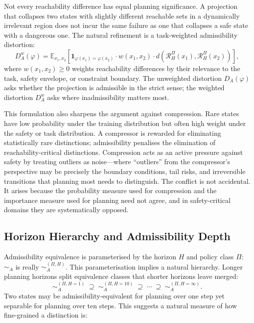 \documentclass[11pt, a4paper]{article}
\theoremstyle{plain}
\theoremstyle{definition}
\theoremstyle{remark}
\newcommand{\simA}{\sim_A}
\newcommand{\RHP}{\mathcal{R}_H^\Pi}
\newcommand{\DA}{D_A(\varphi)}
\begin{document}
Not every reachability difference has equal planning significance. A projection
that collapses two states with slightly different reachable sets in a dynamically
irrelevant region does not incur the same failure as one that collapses a safe
state with a dangerous one. The natural refinement is a task-weighted admissibility
distortion:
\begin{equation}
  D_A^w(\varphi)
  = \mathbb{E}_{x_1,x_2}\!\left[
      \mathbf{1}_{\varphi(x_1)=\varphi(x_2)}
      \cdot w(x_1,x_2)
      \cdot d\!\left(\RHP(x_1),\RHP(x_2)\right)
    \right],
\end{equation}
where $w(x_1,x_2) \geq 0$ weights reachability differences by their relevance
to the task, safety envelope, or constraint boundary. The unweighted distortion
$\DA$ asks whether the projection is admissible in the strict sense; the weighted
distortion $D_A^w$ asks where inadmissibility matters most.

This formulation also sharpens the argument against compression. Rare states have
low probability under the training distribution but often high weight under the
safety or task distribution. A compressor is rewarded for eliminating statistically
rare distinctions; admissibility penalises the elimination of reachability-critical
distinctions. Compression acts as an active pressure against safety by treating
outliers as noise---where ``outliers'' from the compressor's perspective may be
precisely the boundary conditions, tail risks, and irreversible transitions that
planning most needs to distinguish. The conflict is not accidental. It arises
because the probability measure used for compression and the importance measure
used for planning need not agree, and in safety-critical domains they are
systematically opposed.

\subsection{Horizon Hierarchy and Admissibility Depth}

Admissibility equivalence is parameterised by the horizon $H$ and policy
class $\Pi$: $\simA$ is really $\sim_A^{(\Pi,H)}$. This parameterisation
implies a natural hierarchy. Longer planning horizons split equivalence classes
that shorter horizons leave merged:
\begin{equation}
  \sim_A^{(\Pi,H=1)}
  \;\supseteq\;
  \sim_A^{(\Pi,H=10)}
  \;\supseteq\;
  \cdots
  \;\supseteq\;
  \sim_A^{(\Pi,H=\infty)}.
\end{equation}
Two states may be admissibility-equivalent for planning over one step yet
separable for planning over ten steps. This suggests a natural measure of
how fine-grained a distinction is:
\end{document}
